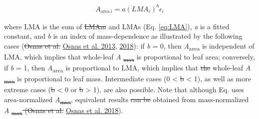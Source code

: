 \documentclass[
  12pt,
]{article}
\providecommand{\DIFaddtex}[1]{{\protect\color{blue}\uwave{#1}}} %
\providecommand{\DIFdeltex}[1]{{\protect\color{red}\sout{#1}}}                      %
\providecommand{\DIFaddbegin}{} %
\providecommand{\DIFaddend}{} %
\providecommand{\DIFdelbegin}{} %
\providecommand{\DIFdelend}{} %
\providecommand{\DIFadd}[1]{\texorpdfstring{\DIFaddtex{#1}}{#1}} %
\providecommand{\DIFdel}[1]{\texorpdfstring{\DIFdeltex{#1}}{}} %
\newcommand{\DIFscaledelfig}{0.5}
\newlength{\DIFdelgraphicswidth} %
\newlength{\DIFdelgraphicsheight} %
\newcommand{\DIFaddincludegraphics}[2][]{{\color{blue}\fbox{\DIFOincludegraphics[#1]{#2}}}} %
\newcommand{\DIFdelincludegraphics}[2][]{%
\sbox{\DIFdelgraphicsbox}{\DIFOincludegraphics[#1]{#2}}%
\settoboxwidth{\DIFdelgraphicswidth}{\DIFdelgraphicsbox} %
\settoboxtotalheight{\DIFdelgraphicsheight}{\DIFdelgraphicsbox} %
\scalebox{\DIFscaledelfig}{%
\parbox[b]{\DIFdelgraphicswidth}{\usebox{\DIFdelgraphicsbox}\\[-\baselineskip] \rule{\DIFdelgraphicswidth}{0em}}\llap{\resizebox{\DIFdelgraphicswidth}{\DIFdelgraphicsheight}{%
\setlength{\unitlength}{\DIFdelgraphicswidth}%
\begin{picture}(1,1)%
\thicklines\linethickness{2pt} %
{\color[rgb]{1,0,0}\put(0,0){\framebox(1,1){}}}%
{\color[rgb]{1,0,0}\put(0,0){\line( 1,1){1}}}%
{\color[rgb]{1,0,0}\put(0,1){\line(1,-1){1}}}%
\end{picture}%
}\hspace*{3pt}}} %
} %
\DeclareRobustCommand{\DIFaddbegin}{\DIFOaddbegin \let\includegraphics\DIFaddincludegraphics} %
\DeclareRobustCommand{\DIFaddend}{\DIFOaddend \let\includegraphics\DIFOincludegraphics} %
\DeclareRobustCommand{\DIFdelbegin}{\DIFOdelbegin \let\includegraphics\DIFdelincludegraphics} %
\DeclareRobustCommand{\DIFdelend}{\DIFOaddend \let\includegraphics\DIFOincludegraphics} %
\begin{document}
\begin{align}
A_{\mathrm{area} \, i} = a (LMA_i)^{b}\epsilon_i \DIFdelbegin %
\DIFdelend \DIFaddbegin \tag{8}
\DIFaddend \end{align}

where LMA is the sum of \DIFdelbegin \DIFdel{LMAm }\DIFdelend \DIFaddbegin \DIFadd{LMAp }\DIFaddend and LMAs (Eq. \eqref{eq:LMA}), \emph{a} is a fitted constant, and \emph{b} is an index of mass-dependence as illustrated by the following cases (\DIFdelbegin \DIFdel{Osnas et al. }\DIFdelend \protect\DIFdelbegin %
\DIFdelend \DIFaddbegin \hyperlink{ref-Osnas2013}{Osnas et al. 2013}\DIFaddend , \protect\hyperlink{ref-Osnas2018}{2018}): if \emph{b} = 0, then \emph{A}\textsubscript{area} is independent of LMA, which implies that whole-leaf \emph{A} \DIFdelbegin \DIFdel{\textsubscript{max} }\DIFdelend is proportional to leaf area; conversely, if \emph{b} = 1, then \emph{A}\textsubscript{area} is proportional to LMA, which implies that \DIFdelbegin \DIFdel{the }\DIFdelend whole-leaf \emph{A} \DIFdelbegin \DIFdel{\textsubscript{max} }\DIFdelend is proportional to leaf mass.
Intermediate cases (0 \textless{} \DIFdelbegin \DIFdel{b }\DIFdelend \DIFaddbegin \emph{\DIFadd{b}} \DIFaddend \textless{} 1), as well as more extreme cases (\DIFdelbegin \DIFdel{b }\DIFdelend \DIFaddbegin \emph{\DIFadd{b}} \DIFaddend \textless{} 0 or \DIFdelbegin \DIFdel{b }\DIFdelend \DIFaddbegin \emph{\DIFadd{b}} \DIFaddend \textgreater{} 1), are also possible.
Note that although Eq. \DIFdelbegin %
\DIFdelend \DIFaddbegin \DIFadd{8 }\DIFaddend uses area-normalized \emph{A}\DIFdelbegin \DIFdel{\textsubscript{max}}\DIFdelend , equivalent results \DIFdelbegin \DIFdel{can be }\DIFdelend \DIFaddbegin \DIFadd{are }\DIFaddend obtained from mass-normalized \emph{A} \DIFdelbegin \DIFdel{\textsubscript{max} (Osnas et al. }\DIFdelend \DIFaddbegin \DIFadd{(}\DIFaddend \protect\DIFdelbegin %
\DIFdelend \DIFaddbegin \hyperlink{ref-Osnas2018}{Osnas et al. 2018}\DIFaddend ).
\end{document}
